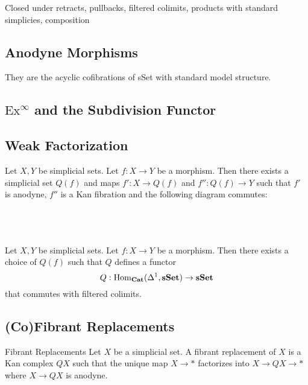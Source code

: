 \documentclass[a4paper]{article}
\begin{document}
Closed under retracts, pullbacks, filtered colimits, products with standard simplicies, composition

\subsection{Anodyne Morphisms}
They are the acyclic cofibrations of sSet with standard model structure. 

\subsection{$\text{Ex}^\infty$ and the Subdivision Functor}

\subsection{Weak Factorization}
\begin{prp}{}{} Let $X,Y$ be simplicial sets. Let $f:X\to Y$ be a morphism. Then there exists a simplicial set $Q(f)$ and maps $f':X\to Q(f)$ and $f'':Q(f)\to Y$ such that $f'$ is anodyne, $f''$ is a Kan fibration and the following diagram commutes: \\~\\
\\~\\
\end{prp}

\begin{prp}{}{} Let $X,Y$ be simplicial sets. Let $f:X\to Y$ be a morphism. Then there exists a choice of $Q(f)$ such that $Q$ defines a functor $$Q:\operatorname{Hom}_\bold{Cat}(\Delta^1,\bold{sSet})\to\bold{sSet}$$ that commutes with filtered colimits. 
\end{prp}

\subsection{(Co)Fibrant Replacements}
\begin{defn}{Fibrant Replacements}{} Let $X$ be a simplicial set. A fibrant replacement of $X$ is a Kan complex $QX$ such that the unique map $X\to\ast$ factorizes into $X\to QX\to\ast$ where $X\to QX$ is anodyne. 
\end{defn}
\end{document}
